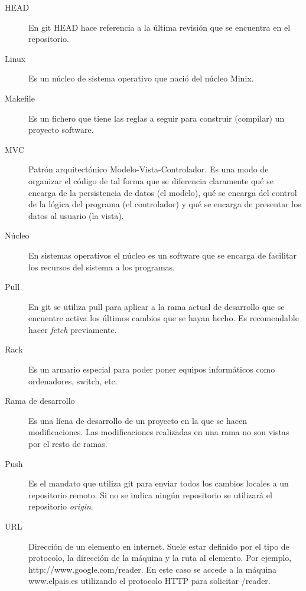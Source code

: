 \begin{description}
	\item[HEAD] En git HEAD hace referencia a la última revisión que se encuentra en el repositorio.

	\item[Linux] Es un núcleo de sistema operativo que nació del núcleo Minix.
	
	\item[Makefile] Es un fichero que tiene las reglas a seguir para construir (compilar) un proyecto software.
	
	\item[MVC] Patrón arquitectónico Modelo-Vista-Controlador. Es una modo de organizar el código de tal forma que se diferencia claramente qué se encarga de la persistencia de datos (el modelo), qué se encarga del control de la lógica del programa (el controlador) y qué se encarga de presentar los datos al usuario (la vista).
	
	\item[Núcleo] En sistemas operativos el núcleo es un software que se encarga de facilitar los recursos del sistema a los programas.
	
	\item[Pull] En git se utiliza pull para aplicar a la rama actual de desarrollo que se encuentre activa los últimos cambios que se hayan hecho. Es recomendable hacer \emph{fetch} previamente.
	
	\item[Rack] Es un armario especial para poder poner equipos informáticos como ordenadores, switch, etc.
	
	\item[Rama de desarrollo] Es una líena de desarrollo de un proyecto en la que se hacen modificaciones. Las modificaciones realizadas en una rama no son vistas por el resto de ramas.
	
	\item[Push] Es el mandato que utiliza git para enviar todos los cambios locales a un repositorio remoto. Si no se indica ningún repositorio se utilizará el repositorio \emph{origin}.
	
	
	\item[URL] Dirección de un elemento en internet. Suele estar definido por el tipo de protocolo, la dirección de la máquina y la ruta al elemento. Por ejemplo, http://www.google.com/reader. En este caso se accede a la máquina www.elpais.es utilizando el protocolo HTTP para solicitar /reader.
\end{description}
